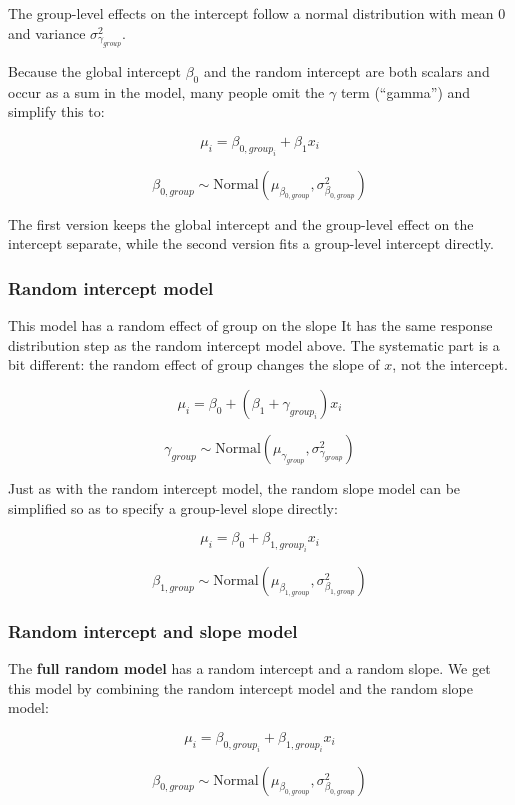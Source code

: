 \documentclass[
  13,
  letterpaper,
]{report}
\begin{document}
The group-level effects on the intercept follow a normal distribution
with mean \(0\) and variance \(\sigma^2_{\gamma_{group}}\).

Because the global intercept \(\beta_0\) and the random intercept are
both scalars and occur as a sum in the model, many people omit the
\(\gamma\) term (``gamma'') and simplify this to:

\[\mu_i=\beta_{0,group_i}+\beta_1x_i\]

\[\beta_{0,group}\sim \text{Normal}\left(\mu_{\beta_{0,group}},\sigma^2_{\beta_{0,group}}\right)\]

The first version keeps the global intercept and the group-level effect
on the intercept separate, while the second version fits a group-level
intercept directly.

\subsubsection{Random intercept
model}\label{sec-mixed-lmm-def-randslope}

This model has a random effect of group on the slope It has the same
response distribution step as the random intercept model above. The
systematic part is a bit different: the random effect of group changes
the slope of \(x\), not the intercept.

\[\mu_i=\beta_0+\left(\beta_1+\gamma_{group_i}\right)x_i\]

\[\gamma_{group}\sim\text{Normal}\left(\mu_{\gamma_{group}},\sigma^2_{\gamma_{group}}\right)\]

Just as with the random intercept model, the random slope model can be
simplified so as to specify a group-level slope directly:

\[\mu_i=\beta_0+\beta_{1,group_i}x_i\]

\[\beta_{1,group}\sim\text{Normal}\left(\mu_{\beta_{1,group}},\sigma^2_{\beta_{1,group}}\right)\]

\subsubsection{Random intercept and slope
model}\label{sec-mixed-lmm-def-randboth}

The \textbf{full random model} has a random intercept and a random
slope. We get this model by combining the random intercept model and the
random slope model:

\[\mu_i=\beta_{0,group_i}+\beta_{1,group_i}x_i\]

\[\beta_{0,group}\sim \text{Normal}\left(\mu_{\beta_{0,group}},\sigma^2_{\beta_{0,group}}\right)\]
\end{document}
